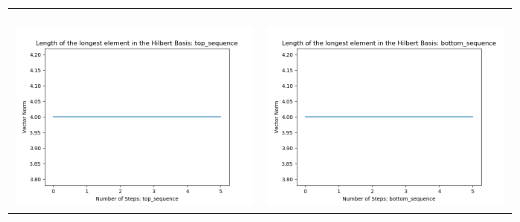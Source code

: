 \documentclass[10pt]{article}
\begin{document}
\begin{tabular}{c|c}
\begin{minipage}{.45\textwidth}
\end{minipage} \\ \\
\hline \\\begin{minipage}{.45\textwidth}
\includegraphics[width=\textwidth]{"DATA/5d/5 generators 2 bound G/top_sequence LENGTH"}
\end{minipage} &
\begin{minipage}{.45\textwidth}
\includegraphics[width=\textwidth]{"DATA/5d/5 generators 2 bound G bottomup/bottom_sequence LENGTH"}
\end{minipage}
\end{tabular}
\end{document}
